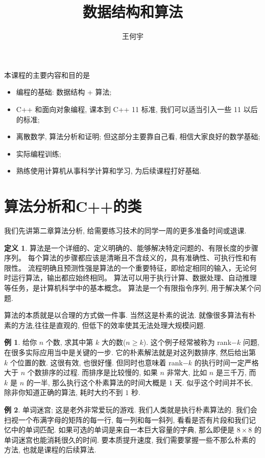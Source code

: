 \documentclass[a4paper]{ctexart}
\title{数据结构和算法}
\author{王何宇}
\date{}
\theoremstyle{definition}
\newtheorem{definition}{定义}[section]
\theoremstyle{definition}
\newtheorem{example}{例}[section]
\begin{document}
\maketitle
\pagestyle{empty}

本课程的主要内容和目的是
\begin{itemize}
\item 编程的基础: 数据结构 + 算法;
\item C++ 和面向对象编程, 课本到 C++ 11 标准, 我们可以适当引入一些 11 以后的标准;
\item 离散数学, 算法分析和证明; 但这部分主要靠自己看, 相信大家良好的数学基础; 
\item 实际编程训练;
\item 熟练使用计算机从事科学计算和学习, 为后续课程打好基础.
\end{itemize}

\section{算法分析和C++的类}
我们先讲第二章算法分析, 给需要练习技术的同学一周的更多准备时间或退课.

\begin{definition}
  算法是一个详细的、定义明确的、能够解决特定问题的、有限长度的步骤序列。
  每个算法的步骤都应该是清晰且不含歧义的，具有准确性、可执行性和有限性。 
  流程明确且预测性强是算法的一个重要特征，即给定相同的输入，无论何时运行算法，输出都应始终相同。 
  算法可以用于执行计算、数据处理、自动推理等任务，是计算机科学中的基本概念。  算法是一个有限指令序列, 用于解决某个问题.
\end{definition}
  
算法的本质就是以合理的方式做一件事. 当然这是朴素的说法.
就像很多算法有朴素的方法,往往是直观的,
但低下的效率使其无法处理大规模问题.

\begin{example}
  给你 $n$ 个数, 求其中第 $k$ 大的数($n \geq k$).
这个例子经常被称为 rank$-k$ 问题,在很多实际应用当中是关键的一步.
它的朴素解法就是对这列数排序, 然后给出第 $k$ 个位置的数. 这很有效,
也很好懂. 但同时也意味着 rank$-k$ 的执行时间一定严格大于 $n$ 个数排序的过程.
而排序是比较慢的, 如果 $n$ 非常大, 比如 $n$ 是三千万, 而 $k$ 是 $n$ 的一半,
那么执行这个朴素算法的时间大概是 $1$ 天. 似乎这个时间并不长, 除非你知道正确的算法,
耗时大约不到 $1$ 秒.
\end{example}

\begin{example}
  单词迷宫; 这是老外非常爱玩的游戏. 我们人类就是执行朴素算法的.
我们会扫视一个布满字母的矩阵的每一行, 每一列和每一斜列, 看看是否有片段和我们记忆中的单词匹配.
如果可选的单词是来自一本巨大容量的字典, 那么即便是 $8 \times 8$ 的单词迷宫也能消耗很久的时间.
要本质提升速度, 我们需要掌握一些不那么朴素的方法, 也就是课程的后续算法.
\end{example}
\end{document}
